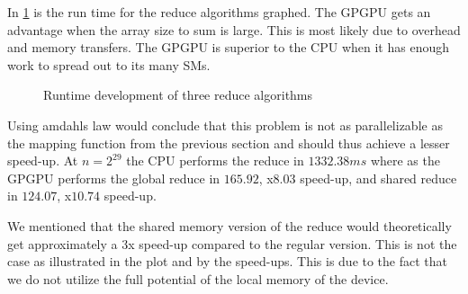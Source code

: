 In \cref{fig:reduce plot} is the run time for the reduce algorithms graphed.
The GPGPU gets an advantage when the array size to sum is large.
This is most likely due to overhead and memory transfers.
The GPGPU is superior to the CPU when it has enough work to spread out to its many SMs.

\begin{figure}[htb]
  \centering
  
  \caption{Runtime development of three reduce algorithms}
  \label{fig:reduce plot}
\end{figure}

Using amdahls law would conclude that this problem is not as parallelizable as the mapping function from the previous section and should thus achieve a lesser speed-up.
At $n=2^{29}$ the CPU performs the reduce in $1332.38ms$ where as the GPGPU performs the global reduce in $165.92$, x$8.03$ speed-up, and shared reduce in $124.07$, x$10.74$ speed-up.

We mentioned that the shared memory version of the reduce would theoretically get approximately a 3x speed-up compared to the regular version.
This is not the case as illustrated in the plot and by the speed-ups.
This is due to the fact that we do not utilize the full potential of the local memory of the device.\cite{udacity}
